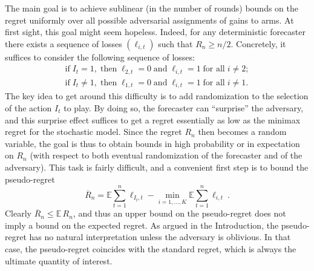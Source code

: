 \documentclass[11pt]{hackednow}
\newcommand{\E}{\mathbb{E}}
\newcommand{\oR}{\overline{R}}
\begin{document}
The main goal is to achieve sublinear (in the number of rounds) bounds on the regret uniformly over all possible adversarial assignments of gains to arms. At first sight, this goal might seem hopeless. Indeed, for any deterministic forecaster there exists a sequence of losses $(\ell_{i,t})$ such that $R_n \geq n/2$. Concretely, it suffices to consider the following sequence of losses:
$$
\begin{array}{c}
\text{if} \; I_t = 1, \; \text{then} \; \ell_{2,t} = 0 \; \text{and} \; \ell_{i,t}=1 \; \text{for all} \; i \neq 2;
\\
\text{if} \; I_t \neq 1, \; \text{then} \; \ell_{1,t} = 0 \; \text{and} \; \ell_{i,t}=1 \; \text{for all} \; i \neq 1.
\end{array}
$$
The key idea to get around this difficulty is to add randomization to the selection of the action $I_t$ to play. By doing so, the forecaster can ``surprise'' the adversary, and this surprise effect suffices to get a regret essentially as low as the minimax regret for the stochastic model. Since the regret $R_n$ then becomes a random variable, the goal is thus to obtain bounds in high probability or in expectation on $R_n$ (with respect to both eventual randomization of the forecaster and of the adversary). This task is fairly difficult, and a convenient first step is to bound the pseudo-regret
\begin{equation} \label{eq:pseudoregretadv}
\oR_n = \E \sum_{t=1}^n \ell_{I_t,t} - \min_{i=1,\hdots,K} \E \sum_{t=1}^n \ell_{i,t}~.
\end{equation}
Clearly $\oR_n \leq \E\,R_n$, and thus an upper bound on the pseudo-regret does not imply a bound on the expected regret. As argued in the Introduction, the pseudo-regret has no natural interpretation unless the adversary is oblivious. In that case, the pseudo-regret coincides with the standard regret, which is always the ultimate quantity of interest.
\end{document}

